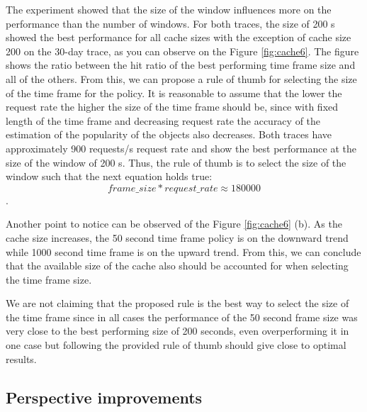 The experiment showed that the size of the window influences more on the performance than the number of windows. For both traces, the size of 200 s showed the best performance for all cache sizes with the exception of cache size 200 on the 30-day trace, as you can observe on the Figure \ref{fig:cache6}. The figure shows the ratio between the hit ratio of the best performing time frame size and all of the others. From this, we can propose a rule of thumb for selecting the size of the time frame for the policy. It is reasonable to assume that the lower the request rate the higher the size of the time frame should be, since with fixed length of the time frame and decreasing request rate the accuracy of the estimation of the popularity of the objects also decreases. Both traces have approximately 900 requests/s request rate and show the best performance at the size of the window of 200 s. Thus, the rule of thumb is to select the size of the window such that the next equation holds true: $$ frame\_size * request\_rate \approx  180000 $$.

Another point to notice can be observed of the Figure \ref{fig:cache6} (b). As the cache size increases, the 50 second time frame policy is on the downward trend while 1000 second time frame is on the upward trend.  From this, we can conclude that the available size of the cache also should be accounted for when selecting the time frame size.

We are not claiming that the proposed rule is the best way to select the size of the time frame since in all cases the performance of the 50 second frame size was very close to the best performing size of 200 seconds, even overperforming it in one case but following the provided rule of thumb should give close to optimal results.

\subsection{Perspective improvements}

